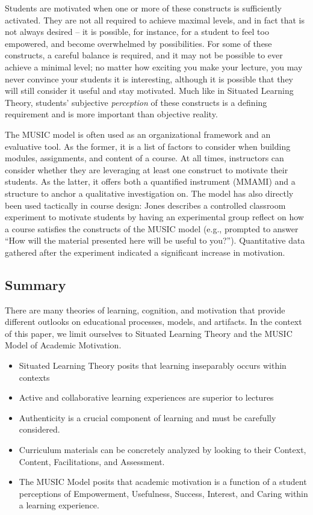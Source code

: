 Students are motivated when one or more of these constructs is sufficiently activated.
They are not all required to achieve maximal levels, and in fact that is not always desired -- it is possible, for instance, for a student to feel too empowered, and become overwhelmed by possibilities.
For some of these constructs, a careful balance is required, and it may not be possible to ever achieve a minimal level; no matter how exciting you make your lecture, you may never convince your students it is interesting, although it is possible that they will still consider it useful and stay motivated.
Much like in Situated Learning Theory, students' subjective \textit{perception} of these constructs is a defining requirement and is more important than objective reality.

The MUSIC model is often used as an organizational framework and an evaluative tool.
As the former, it is a list of factors to consider when building modules, assignments, and content of a course.
At all times, instructors can consider whether they are leveraging at least one construct to motivate their students.
As the latter, it offers both a quantified instrument (MMAMI) and a structure to anchor a qualitative investigation on.
The model has also directly been used tactically in course design: Jones describes a controlled classroom experiment to motivate students by having an experimental group reflect on how a course satisfies the constructs of the MUSIC model (e.g., prompted to answer ``How will the material presented here will be useful to you?'').
Quantitative data gathered after the experiment indicated a significant increase in motivation.

\subsection{Summary}

There are many theories of learning, cognition, and motivation that provide different outlooks on educational processes, models, and artifacts. In the context of this paper, we limit ourselves to Situated Learning Theory and the MUSIC Model of Academic Motivation. 

\begin{itemize}
	\item Situated Learning Theory posits that learning inseparably occurs within contexts
	\item Active and collaborative learning experiences are superior to lectures
	\item Authenticity is a crucial component of learning and must be carefully considered.
	\item Curriculum materials can be concretely analyzed by looking to their Context, Content, Facilitations, and Assessment.
	\item The MUSIC Model posits that academic motivation is a function of a student perceptions of Empowerment, Usefulness, Success, Interest, and Caring within a learning experience.
\end{itemize}


